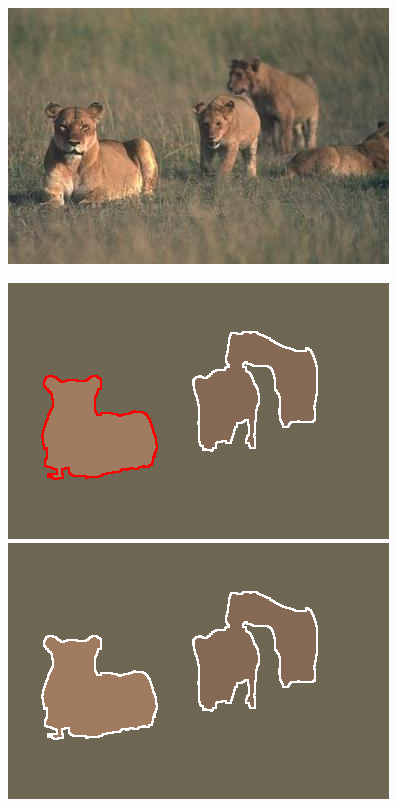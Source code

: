 \begin{figure}
\begin{center}
\begin{minipage}{0.24\linewidth}
\includegraphics[width=\linewidth]{scale-aware/fig/aligned_lions/cropped_image.jpg}
\end{minipage}
\begin{minipage}{0.24\linewidth}
\includegraphics[width=\linewidth]{scale-aware/fig/aligned_lions/mcg_underseg.png}\\[1mm]
\includegraphics[width=\linewidth]{scale-aware/fig/aligned_lions/mcg_our_underseg.png}

\end{minipage}
\end{center}
\end{figure}
